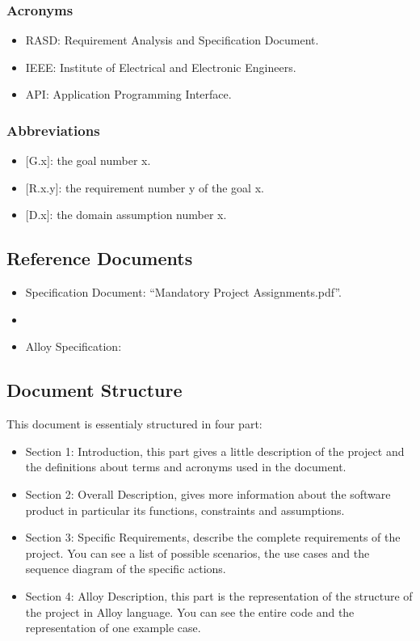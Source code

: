 \subsubsection{Acronyms}
\renewcommand{\labelitemi}{$-$}
\begin{itemize}
\item
RASD: Requirement Analysis and Specification Document.
\item
IEEE: Institute of Electrical and Electronic Engineers.
\item
API: Application Programming Interface.
\end{itemize}

\subsubsection{Abbreviations}
\renewcommand{\labelitemi}{$-$}
\begin{itemize}
\item
$[$G.x$]$: the goal number x.
\item
$[$R.x.y$]$: the requirement number y of the goal x.
\item
$[$D.x$]$: the domain assumption number x.
\end{itemize}

\subsection{Reference Documents}
\renewcommand{\labelitemi}{$-$}
\begin{itemize}
\item
Specification Document: “Mandatory Project Assignments.pdf”.
\item
\href{http://ieeexplore.ieee.org/servlet/opac?punumber=6146377}{\color{Black}{IEEE Std 29148-2011 - ISO/IEC/IEEE International Standard - Systems and software engineering.}}
\item
Alloy Specification:\href{http://alloy.mit.edu/alloy/}{\color{Black}{"Software Abstractation", Daniel Jackson.}}
\end{itemize}

\subsection{Document Structure}
This document is essentialy structured in four part:
\begin{itemize}
\item
Section 1: Introduction, this part gives a little description of the project and the definitions about terms and acronyms used in the document.
\item
Section 2: Overall Description, gives more information about the software product in particular its functions, constraints and assumptions.
\item
Section 3: Specific Requirements, describe the complete requirements of the project. You can see a list of possible scenarios, the use cases and the sequence diagram of the specific actions.
\item
Section 4: Alloy Description, this part is the representation of the structure of the project in Alloy language. You can see the entire code and the representation of one example case.
\end{itemize}